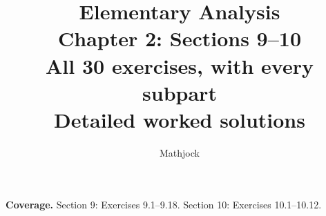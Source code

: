 
\title{\textbf{Elementary Analysis}\\[0.3em]
Chapter 2: Sections 9--10\\[0.4em]
\large All 30 exercises, with every subpart\\
Detailed worked solutions}
\author{Mathjock}
\date{}

\maketitle
\bookinfo
\par\textbf{Coverage.} Section 9: Exercises 9.1--9.18. Section 10: Exercises 10.1--10.12.
\tableofcontents
\clearpage
\setcounter{section}{8}

\clearpage



